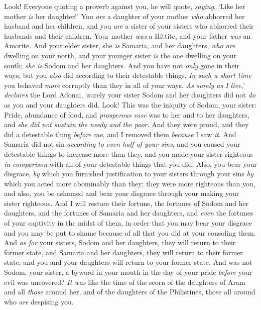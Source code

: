 \begin{biblechapter}
\verse Look! Everyone quoting a proverb against you, he will quote, \textit{saying}, ‘Like her mother \textit{is} her daughter!’
\verse You \textit{are} a daughter of your mother \textit{who} abhorred her husband and her children, and you \textit{are} a sister of your sisters who abhorred their husbands and their children. Your mother \textit{was} a Hittite, and your father \textit{was} an Amorite.
\verse And your elder sister, she \textit{is} Samaria, and her daughters, \textit{who are} dwelling on your north, and your younger sister \textit{is} the one dwelling on your south; \textit{she} \textit{is} Sodom and her daughters.
\verse And you have not \textit{only} gone in their ways, but you \textit{also} did according to their detestable things. \textit{In such a short time} you behaved \textit{more} corruptly than they in all of your ways.
\verse \textit{As surely as I live},’ \textit{declares} the Lord Adonai, ‘surely your sister Sodom and her daughters did not \textit{do} as you and your daughters did.
\verse Look! This was the iniquity of Sodom, your sister: Pride, abundance of food, and \textit{prosperous ease} was to her and to her daughters, and \textit{she did not sustain the needy and the poor}.
\verse And they were proud, and they did a detestable thing \textit{before me}, and I removed them \textit{because} I saw \textit{it}.
\verse And Samaria did not sin \textit{according to even half of your sins}, and you caused your detestable things to increase more than they, and you made your sister righteous \textit{in comparison} with all of your detestable things that you did.
\verse Also, you bear your disgrace, \textit{by} which you furnished justification to your sisters through your sins \textit{by} which you acted more abominably than they; they were more righteous than you, and also, you be ashamed and bear your disgrace through your making your sister righteous.
\verse And I will restore their fortune, the fortunes of Sodom and her daughters, and the fortunes of Samaria and her daughters, and \textit{even} the fortunes of your captivity in the midst of them,
\verse in order that you may bear your disgrace and you may be put to shame because of all that you did at your consoling them.
\verse And \textit{as for} your sisters, Sodom and her daughters, they will return to their former state, and Samaria and her daughters, they will return to their former state, and you and your daughters will return to your former state.
\verse And was not Sodom, your sister, a byword in your mouth in the day of your pride
\verse \textit{before} your evil was uncovered? \textit{It was} like the time of the scorn of the daughters of Aram and all \textit{those} around her, and of the daughters of the Philistines, those all around who \textit{are} despising you.

\end{biblechapter}

